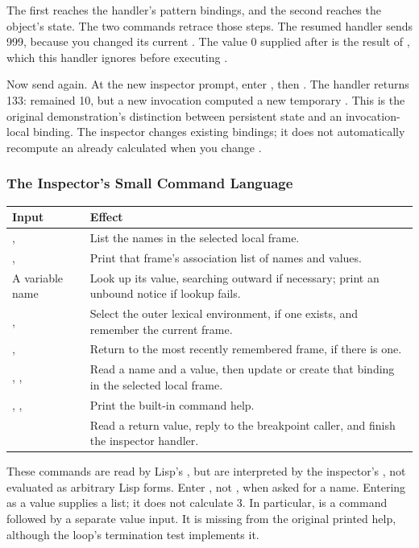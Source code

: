 The first  reaches the handler's pattern bindings, and the second
reaches the object's state. The two  commands retrace those steps.
The resumed handler sends 999, because you changed its current .
The value 0 supplied after  is the result of
, which this handler ignores before executing
.

Now send \code{[foo <== 123]} again. At the new inspector prompt, enter
, then . The handler returns 133:  remained 10,
but a new invocation computed a new temporary .
This is the original demonstration's distinction between persistent state
and an invocation-local binding. The inspector changes existing bindings;
it does not automatically recompute an already calculated 
when you change .

\subsubsection{The Inspector's Small Command Language}

\begin{longtable}{L{0.25\textwidth}L{0.65\textwidth}}
\textbf{Input} & \textbf{Effect}\\\hline
\endhead
{},  & List the names in the selected local frame.\\
,  & Print that frame's association list of names and values.\\
A variable name & Look up its value, searching outward if necessary;
print an unbound notice if lookup fails.\\
,  & Select the outer lexical environment, if one exists,
and remember the current frame.\\
,  & Return to the most recently remembered frame,
if there is one.\\
, , \code{:=} & Read a name and a value, then update
or create that binding in the selected local frame.\\
, ,  & Print the built-in command help.\\
 & Read a return value, reply to the breakpoint caller, and finish
the inspector handler.\\
\end{longtable}

These commands are read by Lisp's , but are interpreted by
the inspector's , not evaluated as arbitrary Lisp forms.
Enter , not , when asked for a name. Entering
 as a value supplies a list; it does not calculate 3.
In particular,  is a command followed by a separate value input.
It is missing from the original printed help, although the loop's
termination test implements it.

